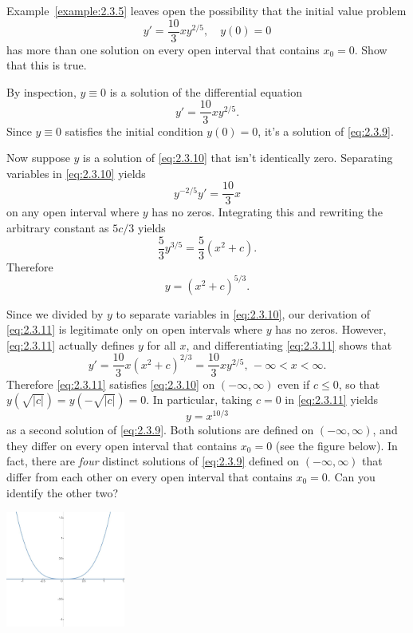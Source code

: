 \documentclass{ximera}
\begin{document}
\begin{example}\label{example:2.3.6}
Example~\ref{example:2.3.5} leaves open the possibility  that the
initial value problem
\begin{equation} \label{eq:2.3.9}
y'=\frac{10}{3}xy^{2/5}, \quad y(0)=0
\end{equation}
has more than one solution on every open interval that contains $x_0=0$.  Show
that this is true.

\begin{explanation}
By inspection, $y\equiv0$ is a solution of the
differential equation
\begin{equation} \label{eq:2.3.10}
y'=\frac{10}{3} xy ^{2/5}.
\end{equation}
 Since $y\equiv0$ satisfies the initial condition $y(0)=0$,
it's a solution of \eqref{eq:2.3.9}.

Now suppose  $y$ is a solution of \eqref{eq:2.3.10} that isn't
identically zero.
 Separating variables in \eqref{eq:2.3.10} yields
$$
 y^{-2/5}y'=\frac{10}{3}x
$$
on any open interval where $y$ has no zeros.
 Integrating this and rewriting the arbitrary constant as $5c/3$ yields
$$
\frac{5}{3}y^{3/5} = \frac{5}{3}(x^2+c).
$$
Therefore
\begin{equation} \label{eq:2.3.11}
y = (x^2+c)^{5/3}.
\end{equation}

Since we divided by $y$ to separate variables in \eqref{eq:2.3.10}, our
derivation of \eqref{eq:2.3.11} is legitimate only on open intervals where $y$
has no zeros. However, \eqref{eq:2.3.11} actually defines $y$ for all $x$,
and differentiating \eqref{eq:2.3.11} shows that
$$
y'=\frac{10}{3}x(x^2+c)^{2/3}=\frac{10}{3}xy^{2/5},\,-\infty<x<\infty.
$$
Therefore \eqref{eq:2.3.11} satisfies \eqref{eq:2.3.10} on
$(-\infty,\infty)$
even if $c\le 0$, so that $y(\sqrt{|c|})=y(-\sqrt{|c|})=0$. In
particular, taking $c=0$ in \eqref{eq:2.3.11} yields
$$
y=x^{10/3}
$$
as a second solution of \eqref{eq:2.3.9}.
 Both solutions are defined on
$(-\infty,\infty)$, and they differ on every
open interval that contains $x_0=0$ (see the figure below).
In fact, there are \textit{four} distinct solutions of
\eqref{eq:2.3.9}  defined on $(-\infty,\infty)$ that differ
from each other on every open interval that contains $x_0=0$.
  Can you identify the other two?

\begin{image}
 \includegraphics[height=1.5in]{fig020302r.JPG}
\end{image}
\end{explanation}
\end{example}
\end{document}
